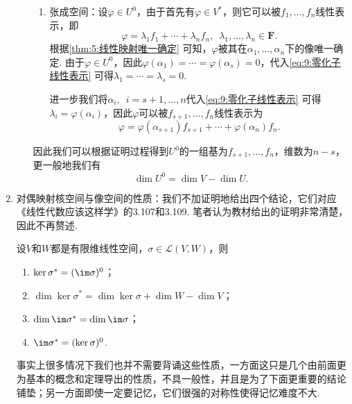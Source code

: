 \begin{enumerate}
\begin{enumerate}
\begin{enumerate}
                        \item 张成空间：设$\varphi\in U^0$，由于首先有$\varphi\in V^*$，则它可以被$f_1,\ldots,f_n$线性表示，即
                              \begin{equation}\label{eq:9:零化子线性表示}
                                  \varphi=\lambda_1f_1+\cdots+\lambda_nf_n,\enspace \lambda_1,\ldots,\lambda_n\in\mathbf{F}.
                              \end{equation}
                              根据\autoref{thm:5:线性映射唯一确定} 可知，$\varphi$被其在$\alpha_1,\ldots,\alpha_n$下的像唯一确定. 由于$\varphi\in U^0$，因此$\varphi(\alpha_1)=\cdots=\varphi(\alpha_s)=0$，代入\autoref{eq:9:零化子线性表示} 可得$\lambda_1=\cdots=\lambda_s=0$.

                              进一步我们将$\alpha_{i},\enspace i=s+1,\ldots,n$代入\autoref{eq:9:零化子线性表示} 可得$\lambda_{i}=\varphi(\alpha_i)$，因此$\varphi$可以被$f_{s+1},\ldots,f_n$线性表示为
                              \[\varphi=\varphi(\alpha_{s+1})f_{s+1}+\cdots+\varphi(\alpha_n)f_n.\]
                    \end{enumerate}
                    因此我们可以根据证明过程得到$U^0$的一组基为$f_{s+1},\ldots,f_n$，维数为$n-s$，更一般地我们有
                    \[\dim U^0=\dim V-\dim U.\]
          \end{enumerate}

    \item 对偶映射核空间与像空间的性质：我们不加证明地给出四个结论，它们对应《线性代数应该这样学》的3.107和3.109. 笔者认为教材给出的证明非常清楚，因此不再赘述.
          \begin{theorem}\label{thm:9:对偶映射像和核的性质}
              设$V$和$W$都是有限维线性空间，$\sigma\in\mathcal{L}(V,W)$，则
              \begin{enumerate}
                  \item $\ker\sigma^*=(\im\sigma)^0$；

                  \item $\dim\ker\sigma^*=\dim\ker\sigma+\dim W-\dim V$；

                  \item $\dim\im\sigma^*=\dim\im\sigma$；

                  \item $\im\sigma^*=(\ker\sigma)^0$.
              \end{enumerate}
          \end{theorem}

          事实上很多情况下我们也并不需要背诵这些性质，一方面这只是几个由前面更为基本的概念和定理导出的性质，不具一般性，并且是为了下面更重要的结论铺垫；另一方面即使一定要记忆，它们很强的对称性使得记忆难度不大.


\end{enumerate}
